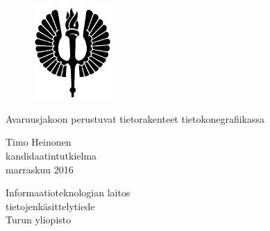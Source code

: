 \thispagestyle{empty}
\begin{figure}
\includegraphics[width=3cm]{img/soihtu.png}
\vspace{4.0cm}
\end{figure}


\begin{center}\Large
Avaruusjakoon perustuvat tietorakenteet tietokonegrafiikassa
\end{center}

\begin{center}
Timo Heinonen\\
kandidaatintutkielma\\
marraskuu 2016
\end{center}

\begin{center}
Informaatioteknologian laitos\\
tietojenkäsittelytiede\\
Turun yliopisto\\
\end{center}

\begin{figure}[b]
\vspace*{-5.0cm}
\end{figure}

